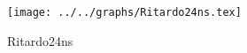 \begin{figure}[h] \centering\texttt{[image: ../../graphs/Ritardo24ns.tex]}\caption{Ritardo24ns}\label{gr:Ritardo24ns} \end{figure}
